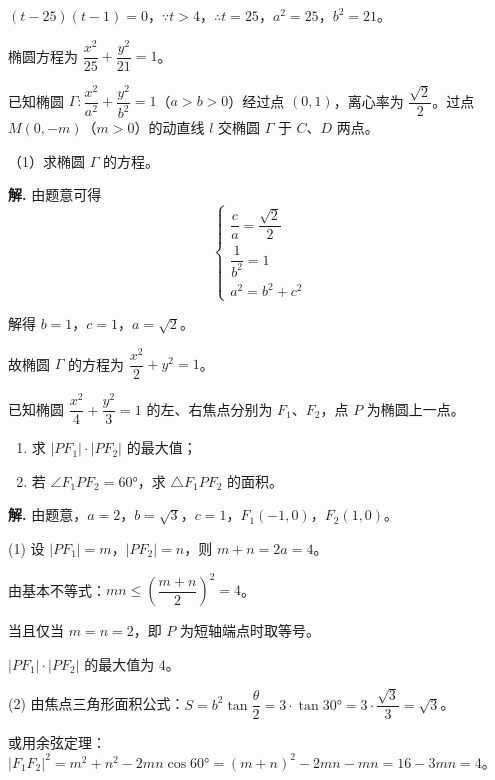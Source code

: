 \documentclass[11pt]{ctexrep}
\begin{document}
$(t - 25)(t - 1) = 0$，$\because t > 4$，$\therefore t = 25$，$a^2 = 25$，$b^2 = 21$。

椭圆方程为 $\boxed{\dfrac{x^2}{25} + \dfrac{y^2}{21} = 1}$。

\begin{realexam}[2026 奉贤二模]
    已知椭圆 $\Gamma: \dfrac{x^2}{a^2} + \dfrac{y^2}{b^2} = 1$（$a > b > 0$）经过点 $(0, 1)$，离心率为 $\dfrac{\sqrt{2}}{2}$。过点 $M(0, -m)$（$m > 0$）的动直线 $l$ 交椭圆 $\Gamma$ 于 $C$、$D$ 两点。
    
    （1）求椭圆 $\Gamma$ 的方程。
\end{realexam}

\textbf{解.} 由题意可得
\[
    \begin{cases}
        \dfrac{c}{a} = \dfrac{\sqrt{2}}{2} \\[6pt]
        \dfrac{1}{b^2} = 1 \\[6pt]
        a^2 = b^2 + c^2
    \end{cases}
\]

解得 $b = 1$，$c = 1$，$a = \sqrt{2}$。

故椭圆 $\Gamma$ 的方程为 $\boxed{\dfrac{x^2}{2} + y^2 = 1}$。

\begin{example}[椭圆的几何性质]
    已知椭圆 $\dfrac{x^2}{4} + \dfrac{y^2}{3} = 1$ 的左、右焦点分别为 $F_1$、$F_2$，点 $P$ 为椭圆上一点。
    \begin{enumerate}
        \item 求 $|PF_1| \cdot |PF_2|$ 的最大值；
        \item 若 $\angle F_1PF_2 = 60°$，求 $\triangle F_1PF_2$ 的面积。
    \end{enumerate}
\end{example}

\textbf{解.} 由题意，$a = 2$，$b = \sqrt{3}$，$c = 1$，$F_1(-1, 0)$，$F_2(1, 0)$。

(1) 设 $|PF_1| = m$，$|PF_2| = n$，则 $m + n = 2a = 4$。

由基本不等式：$mn \leq \left(\dfrac{m + n}{2}\right)^2 = 4$。

当且仅当 $m = n = 2$，即 $P$ 为短轴端点时取等号。

$|PF_1| \cdot |PF_2|$ 的最大值为 $\boxed{4}$。

(2) 由焦点三角形面积公式：$S = b^2 \tan\dfrac{\theta}{2} = 3 \cdot \tan 30° = 3 \cdot \dfrac{\sqrt{3}}{3} = \sqrt{3}$。

或用余弦定理：$|F_1F_2|^2 = m^2 + n^2 - 2mn\cos 60° = (m + n)^2 - 2mn - mn = 16 - 3mn = 4$。
\end{document}
